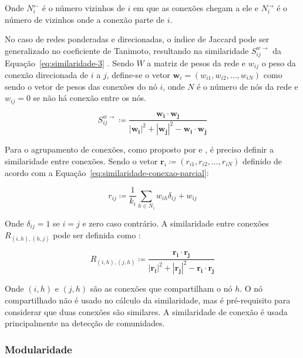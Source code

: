 \documentclass[12pt,a4paper,final]{article}
\renewcommand\vec{\mathbf} %
\newcommand{\defn}{\coloneqq} %
\newcommand{\linkin}[1]{#1^\leftarrow} %
\newcommand{\linkout}[1]{#1^\rightarrow} %
\newcommand{\weighteddir}[1]{#1^{w\rightarrow}} %
\begin{document}
Onde $\linkin{N}_i$ é o número vizinhos de $i$ em que as conexões chegam a ele e $\linkout{N}_i$ é o número de vizinhos onde a conexão parte de $i$.

No caso de redes ponderadas e direcionadas, o índice de Jaccard pode ser generalizado no coeficiente de Tanimoto, resultando na similaridade $\weighteddir{S}_{ij}$ da Equação~\ref{eq:similaridade-3} \cite{Ahn2010-uh}. Sendo $W$ a matriz de pesos da rede e $w_{ij}$ o peso da conexão direcionada de $i$ a $j$, define-se o vetor $\vec{w}_i = (w_{i1},w_{i2},\ldots,w_{iN})$ como sendo o vetor de pesos das conexões do nó $i$, onde $N$ é o número de nós da rede e $w_{ij} = 0$ se não há conexão entre os nós.

\begin{equation}
\weighteddir{S}_{ij} \defn \frac{\vec{w_i} \cdot \vec{w_j}}{|\vec{w_i}|^2 + |\vec{w_j}|^2 - \vec{w_i} \cdot \vec{w_j}}
\end{equation}

Para o agrupamento de conexões, como proposto por  e , é preciso definir a similaridade entre conexões. Sendo o vetor $\vec{r}_{i} \defn (r_{i1}, r_{i2}, \ldots, r_{iN})$ definido de acordo com a Equação~\ref{eq:similaridade-conexao-parcial}:

\begin{equation} \label{eq:similaridade-conexao-parcial}
r_{ij} \defn \frac{1}{k_i} \sum_{h \in N_i} w_{ih}\delta_{ij} + w_{ij}
\end{equation}

Onde $\delta_{ij} = 1$ se $i = j$ e zero caso contrário. A similaridade entre conexões $R_{(i,h),(h,j)}$ pode ser definida como \cite{Ahn2010-uh}:

\begin{equation}
R_{(i,h),(j,h)} \defn \frac{\vec{r_i} \cdot \vec{r_j}}{|\vec{r_i}|^2 + |\vec{r_j}|^2 -  \vec{r_i} \cdot \vec{r_j}}
\end{equation}

Onde $(i,h)$ e $(j,h)$ são as conexões que compartilham o nó $h$. O nó compartilhado não é usado no cálculo da similaridade, mas é pré-requisito para considerar que duas conexões são similares. A similaridade de conexão é usada principalmente na detecção de comunidades.

\subsubsection{Modularidade} \label{sec:modularidade}
\end{document}
